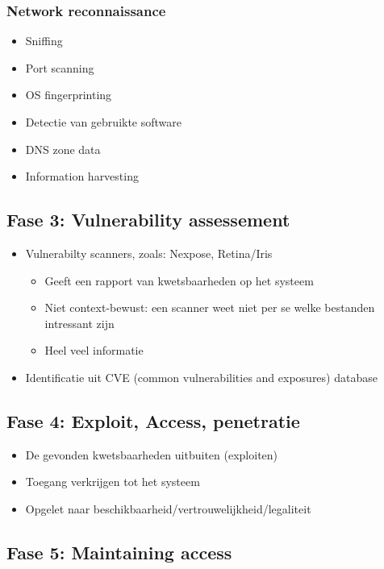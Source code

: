 \documentclass{article}
\begin{document}
\subsubsection{Network reconnaissance}

\begin{itemize}
    \item Sniffing
    \item Port scanning
    \item OS fingerprinting
    \item Detectie van gebruikte software
    \item DNS zone data
    \item Information harvesting
\end{itemize}

\subsection{Fase 3: Vulnerability assessement}

\begin{itemize}
    \item Vulnerabilty scanners, zoals: Nexpose, Retina/Iris
    \begin{itemize}
        \item Geeft een rapport van kwetsbaarheden op het systeem
        \item Niet context-bewust: een scanner weet niet per se welke bestanden intressant zijn
        \item Heel veel informatie
    \end{itemize}
    \item Identificatie uit CVE (common vulnerabilities and exposures) database
\end{itemize}

\subsection{Fase 4: Exploit, Access, penetratie}

\begin{itemize}
    \item De gevonden kwetsbaarheden uitbuiten (exploiten)
    \item Toegang verkrijgen tot het systeem
    \item Opgelet naar beschikbaarheid/vertrouwelijkheid/legaliteit
\end{itemize}


\subsection{Fase 5: Maintaining access}
\end{document}
